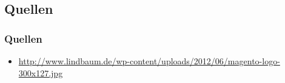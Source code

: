 \documentclass[xcolor=dvipsnames]{beamer}
\begin{document}
\subsection{Quellen}
\begin{frame} %
  \frametitle{Quellen} %
 	\begin{itemize}
			\item \url{http://www.lindbaum.de/wp-content/uploads/2012/06/magento-logo-300x127.jpg}	
	\end{itemize}
\end{frame}
\end{document}
